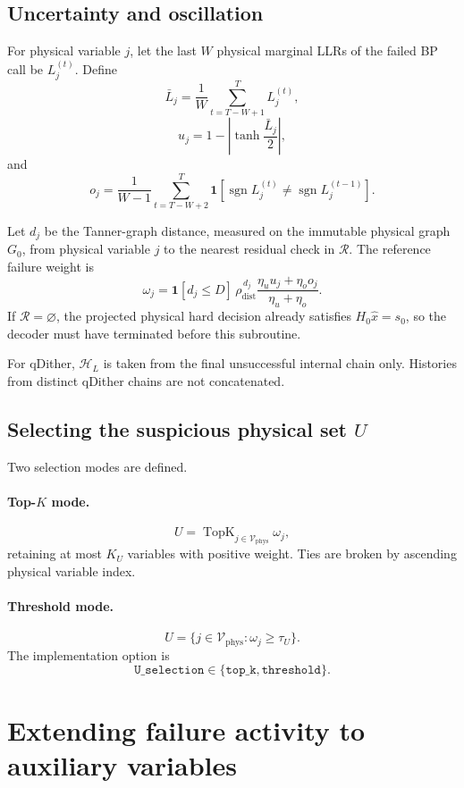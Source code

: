 \documentclass[11pt,a4paper]{article}
\newcommand{\TopK}{\operatorname{TopK}}
\newcommand{\Vphys}{\mathcal V_{\mathrm{phys}}}
\newcommand{\sgn}{\operatorname{sgn}}
\newcommand{\ind}{\mathbf 1}
\begin{document}
\subsection{Uncertainty and oscillation}

For physical variable $j$, let the last $W$ physical marginal LLRs of the
failed BP call be $L_j^{(t)}$. Define
\[
\bar L_j
=
\frac1W\sum_{t=T-W+1}^{T}L_j^{(t)},
\]
\[
u_j
=
1-\left|\tanh\frac{\bar L_j}{2}\right|,
\]
and
\[
o_j
=
\frac1{W-1}
\sum_{t=T-W+2}^{T}
\ind\!\left[
\sgn L_j^{(t)}
\ne
\sgn L_j^{(t-1)}
\right].
\]

Let $d_j$ be the Tanner-graph distance, measured on the immutable physical
graph $G_0$, from physical variable $j$ to the nearest residual check in
$\mathcal R$. The reference failure weight is
\[
\boxed{
\omega_j
=
\ind[d_j\le D]
\,\rho_{\mathrm{dist}}^{\,d_j}
\frac{\eta_u u_j+\eta_o o_j}{\eta_u+\eta_o}.
}
\]
If $\mathcal R=\varnothing$, the projected physical hard decision already
satisfies $H_0\hat x=s_0$, so the decoder must have terminated before this
subroutine.

For qDither, $\mathcal H_L$ is taken from the final unsuccessful internal
chain only. Histories from distinct qDither chains are not concatenated.

\subsection{Selecting the suspicious physical set $U$}

Two selection modes are defined.

\paragraph{Top-$K$ mode.}
\[
U
=
\TopK_{j\in\Vphys}\omega_j,
\]
retaining at most $K_U$ variables with positive weight. Ties are broken by
ascending physical variable index.

\paragraph{Threshold mode.}
\[
U
=
\{j\in\Vphys:\omega_j\ge\tau_U\}.
\]
The implementation option is
\[
\texttt{U\_selection}\in
\{\texttt{top\_k},\texttt{threshold}\}.
\]

\section{Extending failure activity to auxiliary variables}
\end{document}
